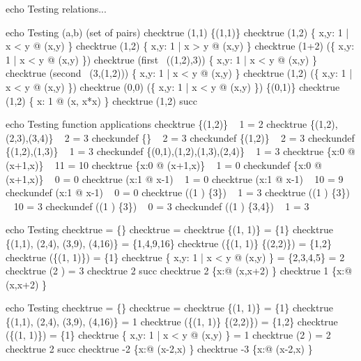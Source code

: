%

echo Testing relations...

echo     Testing (a,b) \in (set of pairs)
checktrue (1,1) \in \{(1,1)\}
checktrue (1,2) \in \{ x,y: 1  | x < y @ (x,y) \}
checktrue (1,2) \notin \{ x,y: 1  | x > y @ (x,y) \}
checktrue (1+2) \in (\ran \{ x,y: 1  | x < y @ (x,y) \})
checktrue (first~ ((1,2),3)) \in \{ x,y: 1  | x < y @ (x,y) \}
checktrue (second~ (3,(1,2))) \in \{ x,y: 1  | x < y @ (x,y) \}
checktrue (1,2) \in    (\{ x,y: 1  | x < y @ (x,y) \}) \cup \emptyset
checktrue (0,0) \notin (\{ x,y: 1  | x < y @ (x,y) \}) \cap \{(0,1)\}
checktrue (1,2) \notin \{ x: 1  @ (x, x*x) \}
checktrue (1,2) \in succ

echo     Testing function applications
checktrue \{(1,2)\} ~ 1 = 2
checktrue \{(1,2),(2,3),(3,4)\} ~ 2 = 3
checkundef \{\} ~ 2 = 3
checkundef \{(1,2)\} ~ 2 = 3
checkundef \{(1,2),(1,3)\} ~ 1 = 3
checkundef \{(0,1),(1,2),(1,3),(2,4)\} ~ 1 = 3
checktrue  \{x:0  @ (x+1,x)\} ~ 11 = 10
checktrue  \{x:0  @ (x+1,x)\} ~ 1 = 0
checkundef \{x:0  @ (x+1,x)\} ~ 0 = 0
checktrue  (\lambda x:1  @ x-1) ~ 1 = 0
checktrue  (\lambda x:1  @ x-1) ~ 10 = 9
checkundef (\lambda x:1  @ x-1) ~ 0 = 0
checktrue   ((1 ) \cross \{3\}) ~ 1 = 3
checktrue   ((1 ) \cross \{3\}) ~ 10 = 3
checkundef  ((1 ) \cross \{3\}) ~ 0 = 3
checkundef  ((1 ) \cross \{3,4\}) ~ 1 = 3


echo     Testing \ran
checktrue \ran \emptyset = \{\}
checktrue \ran \emptyset = \emptyset
checktrue \ran \{(1, 1)\} = \{1\}
checktrue \ran \{(1,1), (2,4), (3,9), (4,16)\} = \{1,4,9,16\}
checktrue \ran (\{(1, 1)\} \cup \{(2,2)\}) = \{1,2\}
checktrue \ran (\emptyset \cup \{(1, 1)\}) = \{1\}
checktrue \ran \{ x,y: 1  | x < y @ (x,y) \} = \{2,3,4,5\} = 2 
checktrue \ran (2   ) = 3 
checktrue 2 \in \ran succ
checktrue 2 \in \ran \{x:\nat @ (x,x+2) \}
checktrue 1 \notin \ran \{x:\nat @ (x,x+2) \}

echo     Testing \dom
checktrue \dom \emptyset = \{\}
checktrue \dom \emptyset = \emptyset
checktrue \dom \{(1, 1)\} = \{1\}
checktrue \dom \{(1,1), (2,4), (3,9), (4,16)\} = 1 
checktrue \dom (\{(1, 1)\} \cup \{(2,2)\}) = \{1,2\}
checktrue \dom (\emptyset \cup \{(1, 1)\}) = \{1\}
checktrue \dom \{ x,y: 1  | x < y @ (x,y) \} = 1 
checktrue \dom (2   ) = 2 
checktrue 2 \in \dom succ
checktrue -2 \in \dom \{x:\nat @ (x-2,x) \}
checktrue -3 \notin \dom \{x:\nat @ (x-2,x) \}

